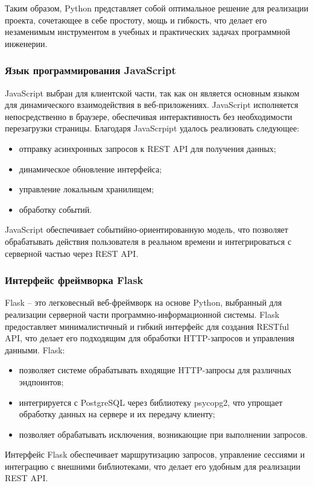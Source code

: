 Таким образом, Python представляет собой оптимальное решение для реализации проекта, сочетающее в себе простоту, мощь и гибкость, что делает его незаменимым инструментом в учебных и практических задачах программной инженерии.

\subsubsection{Язык программирования JavaScript}
JavaScript выбран для клиентской части, так как он является основным языком для динамического взаимодействия в веб-приложениях. JavaScript исполняется непосредственно в браузере, обеспечивая интерактивность без необходимости перезагрузки страницы. Благодаря JavaScrpipt удалось реализовать следующее:
\begin{itemize}
	\item отправку асинхронных запросов к REST API для получения данных;
	\item динамическое обновление интерфейса;
	\item управление локальным хранилищем;
	\item обработку событий.
\end{itemize}
JavaScript обеспечивает событийно-ориентированную модель, что позволяет обрабатывать действия пользователя в реальном времени и интегрироваться с серверной частью через REST API.

\subsubsection{Интерфейс фреймворка Flask}
Flask -- это легковесный веб-фреймворк на основе Python, выбранный для реализации серверной части программно-информационной системы. Flask предоставляет минималистичный и гибкий интерфейс для создания RESTful API, что делает его подходящим для обработки HTTP-запросов и управления данными. Flask:

\begin{itemize}
	\item позволяет системе обрабатывать входящие HTTP-запросы для различных эндпоинтов;
	\item интегрируется с PostgreSQL через библиотеку psycopg2, что упрощает обработку данных на сервере и их передачу клиенту;
	\item позволяет обрабатывать исключения, возникающие при выполнении запросов.
\end{itemize}

Интерфейс Flask обеспечивает маршрутизацию запросов, управление сессиями и интеграцию с внешними библиотеками, что делает его удобным для реализации REST API.

